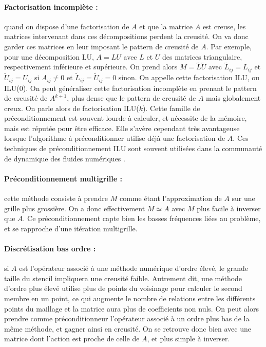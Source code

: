 		\paragraph{Factorisation incomplète :}
		quand on dispose d'une factorisation de $A$ et que la matrice $A$ est creuse, les matrices intervenant dans ces décompositions perdent la creusité.
		On va donc garder ces matrices en leur imposant le pattern de creusité de $A$.
    Par exemple, pour une décomposition LU, $A = LU$ avec $L$ et $U$ des matrices triangulaire, respectivement inférieure et supérieure.
		On prend alors $M=\widetilde{L}\widetilde{U}$ avec $\widetilde{L}_{ij}=L_{ij}$ et $\widetilde{U}_{ij}=U_{ij}$ si $A_{ij}\neq0$ et $\widetilde{L}_{ij}=\widetilde{U}_{ij}=0$ sinon.
    On appelle cette factorisation ILU, ou ILU(0).
		On peut généraliser cette factorisation incomplète en prenant le pattern de creusité de $A^{k+1}$, plus dense que le pattern de creusité de $A$ mais globalement creux.
    On parle alors de factorisation ILU($k$).
		Cette famille de préconditionnement est souvent lourde à calculer, et nécessite de la mémoire, mais est réputée pour être efficace.
		Elle s'avère cependant très avantageuse lorsque l'algorithme à préconditionner utilise déjà une factorisation de $A$.
    Ces techniques de préconditionnement ILU sont souvent utilisées dans la communauté de dynamique des fluides numériques \cite{LiuZhangZhongEtAl2015, AhrabiMavriplis2020}.

		\paragraph{Préconditionnement multigrille :}
		cette méthode consiste à prendre $M$ comme étant l'approximation de $A$ sur une grille plus grossière.
		On a donc effectivement $M\simeq A$ avec $M$ plus facile à inverser que $A$.
		Ce préconditionnement capte bien les basses fréquences liées au problème, et se rapproche d'une itération multigrille.

		\paragraph{Discrétisation bas ordre :}
		si $A$ est l'opérateur associé à une méthode numérique d'ordre élevé, le grande taille du stencil impliquera une creusité faible.
		Autrement dit, une méthode d'ordre plus élevé utilise plus de points du voisinage pour calculer le second membre en un point, ce qui augmente le nombre de relations entre les différents points du maillage et la matrice aura plus de coefficients non nuls.
		On peut alors prendre comme préconditionneur l'opérateur associé à un ordre plus bas de la même méthode, et gagner ainsi en creusité.
		On se retrouve donc bien avec une matrice dont l'action est proche de celle de $A$, et plus simple à inverser.

